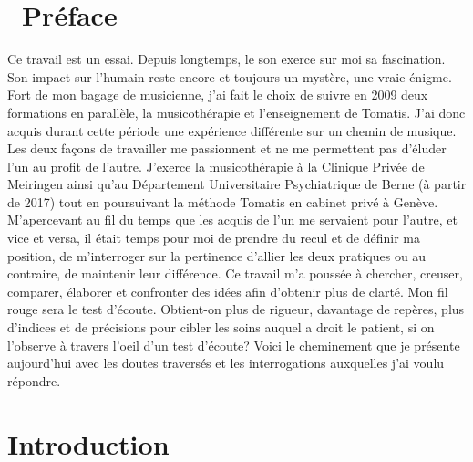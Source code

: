 
\chapter*{\ Préface}
Ce travail est un essai. Depuis longtemps, le son exerce sur moi sa fascination.
 Son impact sur l'humain reste encore et toujours un mystère, une vraie énigme. 
 Fort de mon bagage de musicienne, j'ai fait  le choix de suivre en 2009 deux formations en parallèle,  
 la musicothérapie et l'enseignement de  Tomatis. J'ai donc acquis durant cette période une expérience 
 différente sur un 
 chemin de musique. Les deux façons de travailler me passionnent et ne me permettent pas 
 d'éluder l'un au profit de l'autre. J'exerce  la musicothérapie à la Clinique Privée de Meiringen ainsi qu'au 
 Département 
 Universitaire Psychiatrique de Berne (à partir de 2017) tout en poursuivant  la méthode 
 Tomatis en cabinet privé à Genève. M'apercevant au fil du temps que les 
 acquis de l'un me servaient  pour l'autre, et vice et versa, il  était temps pour moi de prendre du recul et 
 de définir ma position, de m'interroger sur la pertinence d'allier  les deux pratiques 
 ou au contraire, de maintenir  leur différence.  Ce travail m'a poussée à chercher, creuser, comparer, 
 élaborer et 
 confronter des idées afin d'obtenir plus de clarté.
 Mon fil rouge sera le test d'écoute.
 Obtient-on  plus de rigueur, davantage de repères, plus d'indices et de précisions pour cibler les 
 soins auquel a droit le patient, si on l'observe à travers l'oeil d'un test d'écoute?
  Voici le cheminement que je présente aujourd'hui avec les doutes traversés et les interrogations 
  auxquelles j'ai 
  voulu répondre. 


\chapter{Introduction}



